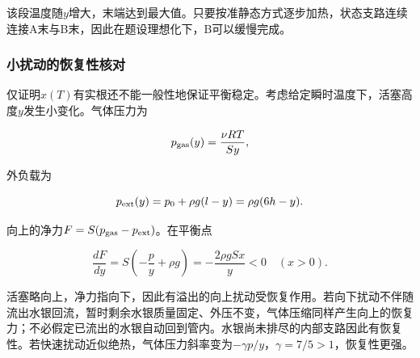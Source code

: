 \documentclass[12pt,a4paper,fontset=fandol]{ctexart}
\begin{document}
\begin{center}
\begin{minipage}{\linewidth}
\centering\begingroup{}
\ifdim\wd\diagrambox>.88\linewidth
\sbox{\diagrambox}{\resizebox{.88\linewidth}{!}{\usebox{\diagrambox}}}\fi
\ifdim\ht\diagrambox>.38\textheight
\resizebox{!}{.38\textheight}{\usebox{\diagrambox}}
\else\usebox{\diagrambox}\fi
\par{}\endgroup\end{minipage}\end{center}

该段温度随\(y\)增大，末端达到最大值。只要按准静态方式逐步加热，状态支路连续连接A末与B末，因此在题设理想化下，B可以缓慢完成。

\subsubsection{小扰动的恢复性核对}\label{ux5c0fux6270ux52a8ux7684ux6062ux590dux6027ux6838ux5bf9}

仅证明\(x(T)\)有实根还不能一般性地保证平衡稳定。考虑给定瞬时温度下，活塞高度\(y\)发生小变化。气体压力为

\[
p_{\rm gas}(y)=\frac{\nu RT}{Sy},
\]

外负载为

\[
p_{\rm ext}(y)=p_0+\rho g(l-y)=\rho g(6h-y).
\]

向上的净力\(F=S(p_{\rm gas}-p_{\rm ext})\)。在平衡点

\[
\frac{dF}{dy}
=S\left(-\frac p y+\rho g\right)
=-\frac{2\rho gSx}{y}<0
\quad(x>0).
\]

活塞略向上，净力指向下，因此有溢出的向上扰动受恢复作用。若向下扰动不伴随流出水银回流，暂时剩余水银质量固定、外压不变，气体压缩同样产生向上的恢复力；不必假定已流出的水银自动回到管内。水银尚未排尽的内部支路因此有恢复性。若快速扰动近似绝热，气体压力斜率变为\(-\gamma p/y\)，\(\gamma=7/5>1\)，恢复性更强。
\end{document}
